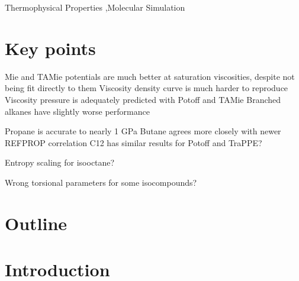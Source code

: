 \documentclass[preprint,review,12pt]{elsarticle}
\begin{document}
\begin{frontmatter}
		\begin{abstract}
			
			
		\end{abstract}
		
		\begin{keyword}
			
			
			
			Thermophysical Properties \sep Molecular Simulation
			
		\end{keyword}
		
	\end{frontmatter}	
	
	\section*{Key points}
	
	Mie and TAMie potentials are much better at saturation viscosities, despite not being fit directly to them
	Viscosity density curve is much harder to reproduce
	Viscosity pressure is adequately predicted with Potoff and TAMie
	Branched alkanes have slightly worse performance
	
	Propane is accurate to nearly 1 GPa
	Butane agrees more closely with newer REFPROP correlation
	C12 has similar results for Potoff and TraPPE?
	
	Entropy scaling for isooctane?
	
	Wrong torsional parameters for some isocompounds?
	
	\section*{Outline}
	
	\section{Introduction}
	
\end{document}
